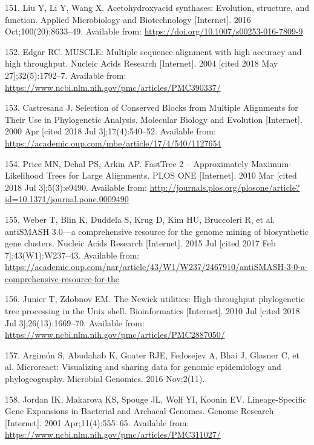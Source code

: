 \documentclass[12pt,twoside]{reedthesis}
\begin{document}
{  \hypertarget{ref-liu_acetohydroxyacid_2016}{}
  151. Liu Y, Li Y, Wang X. Acetohydroxyacid synthases: Evolution,
  structure, and function. Applied Microbiology and Biotechnology
  {[}Internet{]}. 2016 Oct;100(20):8633--49. Available from:
  \url{https://doi.org/10.1007/s00253-016-7809-9}
  
  \hypertarget{ref-edgar_muscle_2004}{}
  152. Edgar RC. MUSCLE: Multiple sequence alignment with high accuracy
  and high throughput. Nucleic Acids Research {[}Internet{]}. 2004
  {[}cited 2018 May 27{]};32(5):1792--7. Available from:
  \url{https://www.ncbi.nlm.nih.gov/pmc/articles/PMC390337/}
  
  \hypertarget{ref-castresana_selection_2000}{}
  153. Castresana J. Selection of Conserved Blocks from Multiple
  Alignments for Their Use in Phylogenetic Analysis. Molecular Biology and
  Evolution {[}Internet{]}. 2000 Apr {[}cited 2018 Jul 3{]};17(4):540--52.
  Available from:
  \url{https://academic.oup.com/mbe/article/17/4/540/1127654}
  
  \hypertarget{ref-price_fasttree_2010}{}
  154. Price MN, Dehal PS, Arkin AP. FastTree 2 -- Approximately
  Maximum-Likelihood Trees for Large Alignments. PLOS ONE {[}Internet{]}.
  2010 Mar {[}cited 2018 Jul 3{]};5(3):e9490. Available from:
  \url{http://journals.plos.org/plosone/article?id=10.1371/journal.pone.0009490}
  
  \hypertarget{ref-weber_antismash3_2015}{}
  155. Weber T, Blin K, Duddela S, Krug D, Kim HU, Bruccoleri R, et al.
  antiSMASH 3.0---a comprehensive resource for the genome mining of
  biosynthetic gene clusters. Nucleic Acids Research {[}Internet{]}. 2015
  Jul {[}cited 2017 Feb 7{]};43(W1):W237--43. Available from:
  \url{https://academic.oup.com/nar/article/43/W1/W237/2467910/antiSMASH-3-0-a-comprehensive-resource-for-the}
  
  \hypertarget{ref-junier_newick_2010}{}
  156. Junier T, Zdobnov EM. The Newick utilities: High-throughput
  phylogenetic tree processing in the Unix shell. Bioinformatics
  {[}Internet{]}. 2010 Jul {[}cited 2018 Jul 3{]};26(13):1669--70.
  Available from:
  \url{https://www.ncbi.nlm.nih.gov/pmc/articles/PMC2887050/}
  
  \hypertarget{ref-argimon_microreact_2016}{}
  157. Argimón S, Abudahab K, Goater RJE, Fedosejev A, Bhai J, Glasner C,
  et al. Microreact: Visualizing and sharing data for genomic epidemiology
  and phylogeography. Microbial Genomics. 2016 Nov;2(11).
  
  \hypertarget{ref-jordan_lineage-specific_2001}{}
  158. Jordan IK, Makarova KS, Spouge JL, Wolf YI, Koonin EV.
  Lineage-Specific Gene Expansions in Bacterial and Archaeal Genomes.
  Genome Research {[}Internet{]}. 2001 Apr;11(4):555--65. Available from:
  \url{https://www.ncbi.nlm.nih.gov/pmc/articles/PMC311027/}
  
}
\end{document}
